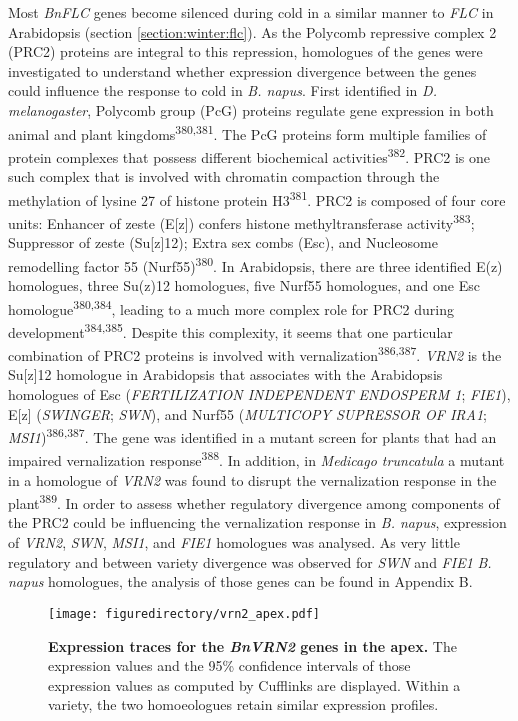 \documentclass[12pt,]{book}
\begin{document}
Most \emph{BnFLC} genes become silenced during cold in a similar manner
to \emph{FLC} in Arabidopsis (section \ref{section:winter:flc}). As the
Polycomb repressive complex 2 (PRC2) proteins are integral to this
repression, homologues of the genes were investigated to understand
whether expression divergence between the genes could influence the
response to cold in \emph{B. napus}. First identified in \emph{D.
melanogaster}, Polycomb group (PcG) proteins regulate gene expression in
both animal and plant kingdoms\textsuperscript{380,381}. The PcG
proteins form multiple families of protein complexes that possess
different biochemical activities\textsuperscript{382}. PRC2 is one such
complex that is involved with chromatin compaction through the
methylation of lysine 27 of histone protein H3\textsuperscript{381}.
PRC2 is composed of four core units: Enhancer of zeste (E{[}z{]})
confers histone methyltransferase activity\textsuperscript{383};
Suppressor of zeste (Su{[}z{]}12); Extra sex combs (Esc), and Nucleosome
remodelling factor 55 (Nurf55)\textsuperscript{380}. In Arabidopsis,
there are three identified E(z) homologues, three Su(z)12 homologues,
five Nurf55 homologues, and one Esc homologue\textsuperscript{380,384},
leading to a much more complex role for PRC2 during
development\textsuperscript{384,385}. Despite this complexity, it seems
that one particular combination of PRC2 proteins is involved with
vernalization\textsuperscript{386,387}. \emph{VRN2} is the Su{[}z{]}12
homologue in Arabidopsis that associates with the Arabidopsis homologues
of Esc (\emph{FERTILIZATION INDEPENDENT ENDOSPERM 1}; \emph{FIE1}),
E{[}z{]} (\emph{SWINGER}; \emph{SWN}), and Nurf55 (\emph{MULTICOPY
SUPRESSOR OF IRA1}; \emph{MSI1})\textsuperscript{386,387}. The gene was
identified in a mutant screen for plants that had an impaired
vernalization response\textsuperscript{388}. In addition, in
\emph{Medicago truncatula} a mutant in a homologue of \emph{VRN2} was
found to disrupt the vernalization response in the
plant\textsuperscript{389}. In order to assess whether regulatory
divergence among components of the PRC2 could be influencing the
vernalization response in \emph{B. napus}, expression of \emph{VRN2},
\emph{SWN}, \emph{MSI1}, and \emph{FIE1} homologues was analysed. As
very little regulatory and between variety divergence was observed for
\emph{SWN} and \emph{FIE1} \emph{B. napus} homologues, the analysis of
those genes can be found in Appendix B.

\begin{figure}[htbp]
\centering
\texttt{[image: figuredirectory/vrn2\_apex.pdf]}
\caption{\textbf{Expression traces for the \emph{BnVRN2} genes in the
apex.} The expression values and the 95\% confidence intervals of those
expression values as computed by Cufflinks are displayed. Within a
variety, the two homoeologues retain similar expression
profiles.}\label{figure:3xx:vrn2apex}
\end{figure}
\end{document}
